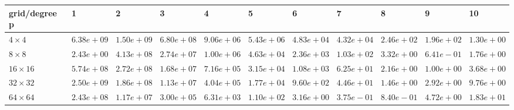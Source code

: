 \begin{tabular}{lllllllllll}
\hline
 grid/degree p   & 1          & 2          & 3          & 4          & 5          & 6          & 7          & 8          & 9          & 10         \\
\hline
 $4 \times 4$    & $6.38e+09$ & $1.50e+09$ & $6.80e+08$ & $9.06e+06$ & $5.43e+06$ & $4.83e+04$ & $4.32e+04$ & $2.46e+02$ & $1.96e+02$ & $1.30e+00$ \\
 $8 \times 8$    & $2.43e+00$ & $4.13e+08$ & $2.74e+07$ & $1.00e+06$ & $4.63e+04$ & $2.36e+03$ & $1.03e+02$ & $3.32e+00$ & $6.41e-01$ & $1.76e+00$ \\
 $16 \times 16$  & $5.74e+08$ & $2.72e+08$ & $1.68e+07$ & $7.16e+05$ & $3.15e+04$ & $1.08e+03$ & $6.25e+01$ & $2.16e+00$ & $1.00e+00$ & $3.68e+00$ \\
 $32 \times 32$  & $2.50e+09$ & $1.86e+08$ & $1.13e+07$ & $4.04e+05$ & $1.77e+04$ & $9.60e+02$ & $4.46e+01$ & $1.46e+00$ & $2.92e+00$ & $9.76e+00$ \\
 $64 \times 64$  & $2.43e+08$ & $1.17e+07$ & $3.00e+05$ & $6.31e+03$ & $1.10e+02$ & $3.16e+00$ & $3.75e-01$ & $8.40e-01$ & $4.72e+00$ & $1.83e+01$ \\
\hline
\end{tabular}